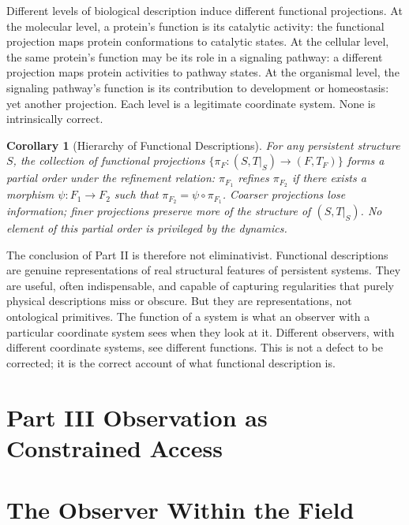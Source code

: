 \documentclass[12pt, a4paper, oneside]{article}
\theoremstyle{plain}
\newtheorem{corollary}[theorem]{Corollary}
\theoremstyle{definition}
\theoremstyle{remark}
\newcommand{\T}{T}
\newcommand{\proj}{\pi}
\begin{document}
Different levels of biological description induce different functional projections. At the molecular level, a protein's function is its catalytic activity: the functional projection maps protein conformations to catalytic states. At the cellular level, the same protein's function may be its role in a signaling pathway: a different projection maps protein activities to pathway states. At the organismal level, the signaling pathway's function is its contribution to development or homeostasis: yet another projection. Each level is a legitimate coordinate system. None is intrinsically correct.

\begin{corollary}[Hierarchy of Functional Descriptions]
For any persistent structure $S$, the collection of functional projections $\{\proj_F : (S, \T|_S) \to (F, \T_F)\}$ forms a partial order under the refinement relation: $\proj_{F_1}$ refines $\proj_{F_2}$ if there exists a morphism $\psi : F_1 \to F_2$ such that $\proj_{F_2} = \psi \circ \proj_{F_1}$. Coarser projections lose information; finer projections preserve more of the structure of $(S, \T|_S)$. No element of this partial order is privileged by the dynamics.
\end{corollary}

The conclusion of Part II is therefore not eliminativist. Functional descriptions are genuine representations of real structural features of persistent systems. They are useful, often indispensable, and capable of capturing regularities that purely physical descriptions miss or obscure. But they are representations, not ontological primitives. The function of a system is what an observer with a particular coordinate system sees when they look at it. Different observers, with different coordinate systems, see different functions. This is not a defect to be corrected; it is the correct account of what functional description is.

\section*{Part III \quad Observation as Constrained Access}

\setcounter{section}{9}

\section{The Observer Within the Field}
\end{document}
